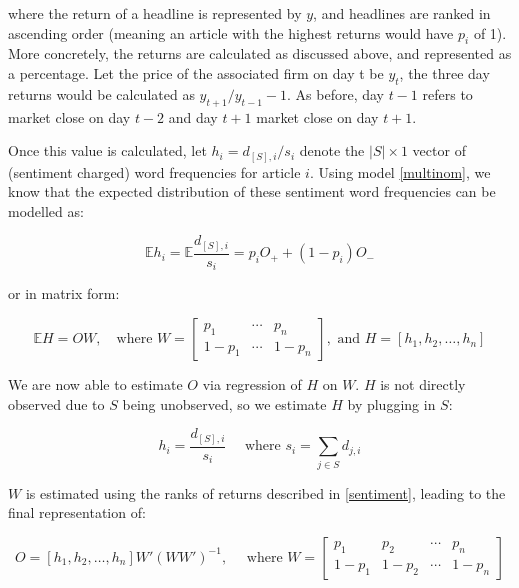 \noindent
where the return of a headline is represented by $y$, and headlines are ranked in ascending order (meaning an article with the highest returns would have $p_i$ of 1). More concretely, the returns are calculated as discussed above, and represented as a percentage. Let the price of the associated firm on day t be $y_t$, the three day returns would be calculated as $y_{t+1}/y_{t-1} - 1$. As before, day $t-1$ refers to market close on day $t-2$ and day $t+1$ market close on day $t+1$.

Once this value is calculated, let $h_i = d_{[S],i}/s_i$ denote the $|S| \times 1$ vector of (sentiment charged) word frequencies for article $i$. Using model \ref{multinom}, we know that the expected distribution of these sentiment word frequencies can be modelled as:

\begin{equation}
\mathbb{E}h_i = \mathbb{E}\frac{d_{[S],i}}{s_i} = p_i O_+ + (1-p_i)O_-
\end{equation}

\noindent
or in matrix form:

\begin{equation}
\mathbb{E}H = OW, \quad \text{where } W = \begin{bmatrix}
      p_1 & \cdots & p_n \\
      1-p_1 & \cdots & 1-p_n
\end{bmatrix}
, \text{ and } H = [h_1,h_2,\dots,h_n]
\end{equation}

\noindent
We are now able to estimate $O$ via regression of $H$ on $W$. $H$ is not directly observed due to $S$ being unobserved, so we estimate $H$ by plugging in $S$:

\begin{equation}
h_i = \frac{d_{[S],i}}{s_i} \quad \text{ where } s_i = \sum_{j \in S} d_{j,i}
\end{equation}

\noindent
$W$ is estimated using the ranks of returns described in \ref{sentiment}, leading to the final representation of:

\begin{equation}
O = [h_1, h_2,\dots, h_n] W' (W W')^{-1}, \quad \text{ where } W = \begin{bmatrix}
      p_1 & p_2 & \cdots & p_n \\
      1-p_1 & 1-p_2 & \cdots & 1-p_n
\end{bmatrix}
\end{equation}

